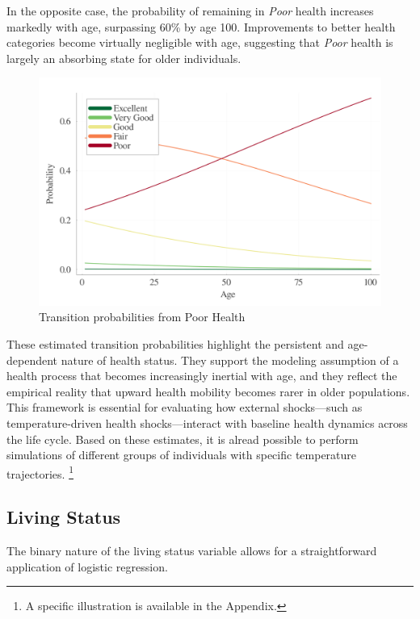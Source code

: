 \documentclass{article}
\begin{document}
In the opposite case, the probability of remaining in \textit{Poor} health increases markedly with age, surpassing 60\% by age 100.
Improvements to better health categories become virtually negligible with age, suggesting that \textit{Poor} health is largely an absorbing state for older individuals.
\begin{figure}\label{fig:health_transition_5}
    \begin{center}
        \includegraphics[width=\linewidth]{output/health_transition_5.png}
        \caption{Transition probabilities from Poor Health}   
    \end{center} 
\end{figure}


These estimated transition probabilities highlight the persistent and age-dependent nature of health status. They support the modeling assumption of a health process that becomes increasingly inertial with age, and they reflect the empirical reality that upward health mobility becomes rarer in older populations. This framework is essential for evaluating how external shocks—such as temperature-driven health shocks—interact with baseline health dynamics across the life cycle.
Based on these estimates, 
it is alread possible to perform 
simulations of different groups of individuals with specific temperature trajectories. 
\footnote{A specific illustration is available in the Appendix.}

\subsection{Living Status}
The binary nature of the living status variable allows for a straightforward application of logistic regression.
\end{document}
